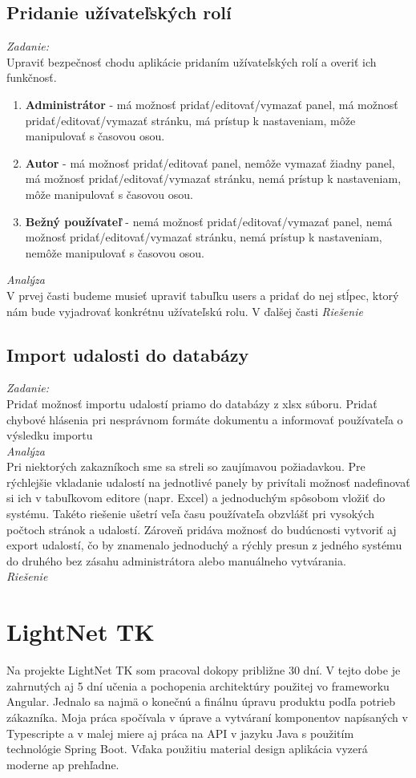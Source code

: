 \documentclass[11pt, oneside]{report}
\begin{document}
\subsection*{Pridanie užívateľských rolí}
\textit{Zadanie:}\\
Upraviť bezpečnosť chodu aplikácie pridaním užívateľských rolí a overiť ich funkčnosť.
\begin{enumerate}
\item \textbf{Administrátor} - má možnosť pridať/editovať/vymazať panel, má možnosť pridať/editovať/vymazať stránku, má prístup k nastaveniam, môže manipulovať s časovou osou.
\item \textbf{Autor} - má možnosť pridať/editovať panel, nemôže vymazať žiadny panel, má možnosť pridať/editovať/vymazať stránku, nemá prístup k nastaveniam, môže manipulovať s časovou osou.
\item \textbf{Bežný používateľ} - nemá možnosť pridať/editovať/vymazať panel, nemá možnosť pridať/editovať/vymazať stránku, nemá prístup k nastaveniam, nemôže manipulovať s časovou osou.
\end{enumerate}
\textit{Analýza}\\
V prvej časti budeme musieť upraviť tabuľku \textsf{users} a pridať do nej stĺpec, ktorý nám bude vyjadrovať konkrétnu užívateľskú rolu. V ďalšej časti 
\textit{Riešenie}\\
\subsection*{Import udalosti do databázy}
\textit{Zadanie:}\\
Pridať možnosť importu udalostí priamo do databázy z xlsx súboru. Pridať  chybové hlásenia pri  nesprávnom formáte dokumentu a informovať používateľa o výsledku importu
\\\textit{Analýza}\\
Pri niektorých zakazníkoch sme sa streli so zaujímavou požiadavkou. Pre rýchlejšie vkladanie  udalostí na jednotlivé panely by privítali možnosť nadefinovať si ich   v tabuľkovom editore (napr. Excel) a jednoduchým spôsobom vložiť do systému. Takéto riešenie ušetrí veľa času používateľa obzvlášť pri vysokých počtoch stránok a udalostí. Zároveň pridáva možnosť  do budúcnosti vytvoriť aj export udalostí, čo by znamenalo  jednoduchý a rýchly presun z jedného systému do druhého bez zásahu administrátora alebo manuálneho vytvárania.
\\\textit{Riešenie}\\
\section{LightNet TK}
Na projekte LightNet TK som pracoval dokopy približne  30 dní. V tejto dobe  je zahrnutých aj 5 dní učenia  a pochopenia architektúry použitej vo frameworku Angular. Jednalo sa najmä o konečnú a finálnu úpravu produktu podľa potrieb zákazníka. Moja práca spočívala v úprave a vytváraní  komponentov napísaných v Typescripte a v malej miere aj práca na API  v jazyku Java s použitím technológie Spring Boot. Vďaka použitiu material design aplikácia vyzerá moderne ap prehľadne.
\end{document}
